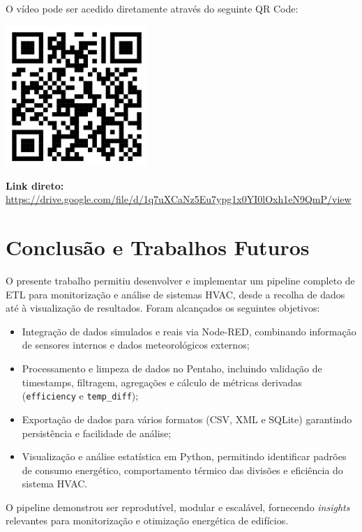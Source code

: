 \documentclass[a4paper, 12pt]{article} %
\begin{document}
O vídeo pode ser acedido diretamente através do seguinte QR Code:

\begin{center}
	\includegraphics[width=0.4\textwidth]{qrcode_video.png}
\end{center}

\noindent \textbf{Link direto:} \url{https://drive.google.com/file/d/1q7uXCaNz5Eu7ypg1x0YI0lOxh1eN9QmP/view}


\newpage
\section{Conclusão e Trabalhos Futuros}

O presente trabalho permitiu desenvolver e implementar um pipeline completo de ETL para monitorização e análise de sistemas HVAC, desde a recolha de dados até à visualização de resultados.  
Foram alcançados os seguintes objetivos:

\begin{itemize}
	\item Integração de dados simulados e reais via Node-RED, combinando informação de sensores internos e dados meteorológicos externos;
	\item Processamento e limpeza de dados no Pentaho, incluindo validação de timestamps, filtragem, agregações e cálculo de métricas derivadas (\texttt{efficiency} e \texttt{temp\_diff});
	\item Exportação de dados para vários formatos (CSV, XML e SQLite) garantindo persistência e facilidade de análise;
	\item Visualização e análise estatística em Python, permitindo identificar padrões de consumo energético, comportamento térmico das divisões e eficiência do sistema HVAC.
\end{itemize}

O pipeline demonstrou ser reprodutível, modular e escalável, fornecendo \textit{insights} relevantes para monitorização e otimização energética de edifícios.
\end{document}
